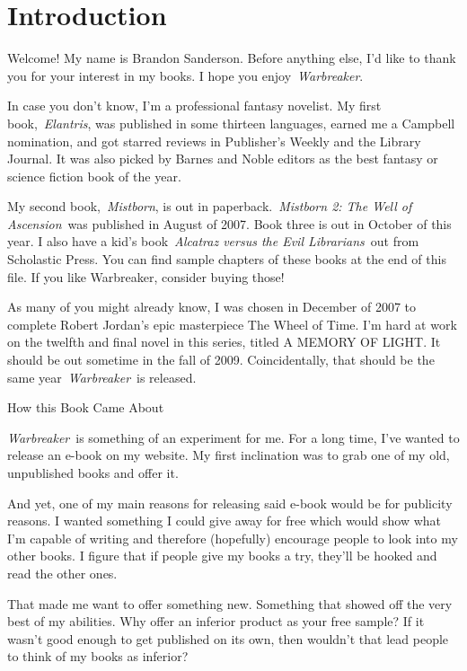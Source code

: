 \section{Introduction}

Welcome! My name is Brandon Sanderson. Before anything else, I’d like to thank you for your interest in my books. I hope you enjoy~\textit{Warbreaker}.

In case you don’t know, I’m a professional fantasy novelist. My first book,~\textit{Elantris}, was published in some thirteen languages, earned me a Campbell nomination, and got starred reviews in Publisher’s Weekly and the Library Journal. It was also picked by Barnes and Noble editors as the best fantasy or science fiction book of the year.

My second book,~\textit{Mistborn}, is out in paperback.~\textit{Mistborn 2: The Well of Ascension}~was published in August of 2007. Book three is out in October of this year. I also have a kid’s book~\textit{Alcatraz versus the Evil Librarians}~out from Scholastic Press. You can find sample chapters of these books at the end of this file. If you like Warbreaker, consider buying those!

As many of you might already know, I was chosen in December of 2007 to complete Robert Jordan’s epic masterpiece The Wheel of Time. I’m hard at work on the twelfth and final novel in this series, titled A MEMORY OF LIGHT. It should be out sometime in the fall of 2009. Coincidentally, that should be the same year~\textit{Warbreaker}~is released.

How this Book Came About

\textit{Warbreaker}~is something of an experiment for me. For a long time, I’ve wanted to release an e-book on my website. My first inclination was to grab one of my old, unpublished books and offer it.

And yet, one of my main reasons for releasing said e-book would be for publicity reasons. I wanted something I could give away for free which would show what I’m capable of writing and therefore (hopefully) encourage people to look into my other books. I figure that if people give my books a try, they’ll be hooked and read the other ones.

That made me want to offer something new. Something that showed off the very best of my abilities. Why offer an inferior product as your free sample? If it wasn’t good enough to get published on its own, then wouldn’t that lead people to think of my books as inferior?

